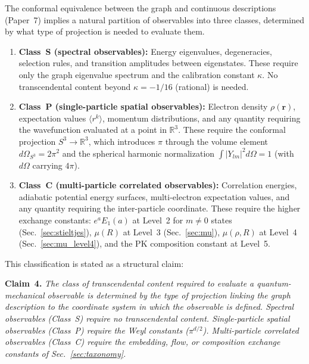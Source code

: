 \documentclass[aps,pra,twocolumn,superscriptaddress,longbibliography]{revtex4-2}
\begin{document}
The conformal equivalence between the graph and continuous descriptions
(Paper~7) implies a natural partition of observables into three classes,
determined by what type of projection is needed to evaluate them.

\begin{enumerate}
  \item \textbf{Class~S (spectral observables):} Energy eigenvalues,
    degeneracies, selection rules, and transition amplitudes between
    eigenstates.  These require only the graph eigenvalue spectrum
    and the calibration constant $\kappa$.  No transcendental content
    beyond $\kappa = -1/16$ (rational) is needed.

  \item \textbf{Class~P (single-particle spatial observables):}
    Electron density $\rho(\mathbf{r})$, expectation values
    $\langle r^k \rangle$, momentum distributions, and any quantity
    requiring the wavefunction evaluated at a point in $\mathbb{R}^3$.
    These require the conformal projection $S^3 \to \mathbb{R}^3$,
    which introduces $\pi$ through the volume element
    $d\Omega_{S^3} = 2\pi^2$ and the spherical harmonic
    normalization $\int |Y_{lm}|^2 d\Omega = 1$ (with
    $d\Omega$ carrying $4\pi$).

  \item \textbf{Class~C (multi-particle correlated observables):}
    Correlation energies, adiabatic potential energy surfaces,
    multi-electron expectation values, and any quantity requiring
    the inter-particle coordinate.  These require the higher exchange
    constants: $e^a E_1(a)$ at Level~2 for $m \neq 0$ states
    (Sec.~\ref{sec:stieltjes}), $\mu(R)$ at Level~3
    (Sec.~\ref{sec:mu}), $\mu(\rho,R)$ at Level~4
    (Sec.~\ref{sec:mu_level4}), and the PK composition constant
    at Level~5.
\end{enumerate}

\noindent This classification is stated as a structural claim:

\medskip
\noindent\textbf{Claim~4.}
\textit{The class of transcendental content required to evaluate a
quantum-mechanical observable is determined by the type of projection
linking the graph description to the coordinate system in which the
observable is defined.  Spectral observables (Class~S) require no
transcendental content.  Single-particle spatial observables (Class~P)
require the Weyl constants ($\pi^{d/2}$).  Multi-particle correlated
observables (Class~C) require the embedding, flow, or composition
exchange constants of Sec.~\ref{sec:taxonomy}.}
\end{document}
